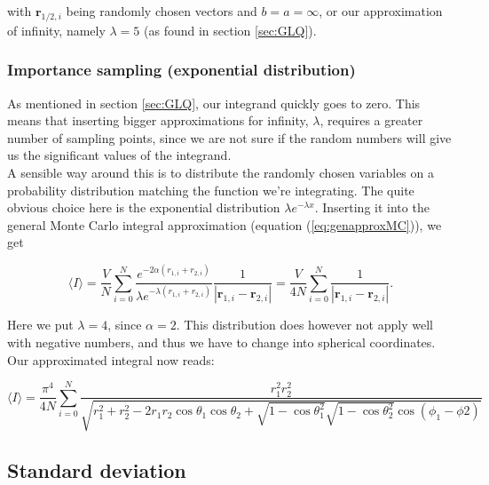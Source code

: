 \documentclass[../main.tex]{subfiles}
\begin{document}
with $\mathbf r_{1/2,i}$ being randomly chosen vectors and $b=a=\infty$, or our approximation of infinity, namely $\lambda = 5$ (as found in section \ref{sec:GLQ}).

\subsubsection{Importance sampling (exponential distribution)} \label{sec:improvedMC}

As mentioned in section \ref{sec:GLQ}, our integrand quickly goes to zero. This means that inserting bigger approximations for infinity, $\lambda$, requires a greater number of sampling points, since we are not sure if the random numbers will give us the significant values of the integrand. \\

A sensible way around this is to distribute the randomly chosen variables on a probability distribution matching the function we're integrating. The quite obvious choice here is the exponential distribution $\lambda e^{-\lambda x}$. Inserting it into the general Monte Carlo integral approximation (equation (\ref{eq:genapproxMC})), we get

\begin{equation*}
  \langle I \rangle =\frac{V}{N}\sum_{i=0}^N\frac{e^{-2\alpha(r_{1,i}+r_{2,i})}}{\lambda e^{-\lambda(r_{1,i}+r_{2,i})}}\frac{1}{|\mathbf r_{1,i}-\mathbf r_{2,i}|}=\frac{V}{4N}\sum_{i=0}^N\frac{1}{|\mathbf r_{1,i} - \mathbf r_{2,i}|}.
\end{equation*}

Here we put $\lambda=4$, since $\alpha=2$. This distribution does however not apply well with negative numbers, and thus we have to change into spherical coordinates. Our approximated integral now reads:

\begin{equation}
  \langle I \rangle =\frac{\pi^4}{4N}\sum_{i=0}^N\frac{r_1^2 r_2^2}{\sqrt{r_1^2+r_2^2-2r_1r_2\cos \theta_1 \cos \theta_2 +\sqrt{1-\cos \theta_1^2}\sqrt{1-\cos \theta_2^2}\cos (\phi_1-\phi2)}}
  \label{eq:improved-approx}
\end{equation}

\subsection{Standard deviation}\label{sec:std}
\end{document}
